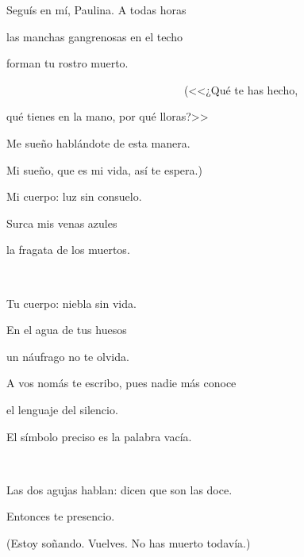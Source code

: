 \documentclass[a4paper, 12pt]{article}
\begin{document}
Seguís en mí, Paulina. A todas horas

las manchas gangrenosas en el techo

forman tu rostro muerto. 

~ ~ ~ ~ ~ ~~~ ~ ~ ~ ~ ~ ~ ~ ~ ~ ~ ~ ~ (<<¿Qué te has hecho,

qué tienes en la mano, por qué lloras?>>

Me sueño hablándote de esta manera.

Mi sueño, que es mi vida, así te espera.)

\pagebreak 

Mi cuerpo: luz sin consuelo.

Surca mis venas azules

la fragata de los muertos.

~ 

Tu cuerpo: niebla sin vida.

En el agua de tus huesos

un náufrago no te olvida.



\pagebreak 

A vos nomás te escribo, pues nadie más conoce 

el lenguaje del silencio.

El símbolo preciso es la palabra vacía.

~

Las dos agujas hablan: dicen que son las doce.

Entonces te presencio.

(Estoy soñando. Vuelves. No has muerto todavía.)
\end{document}
